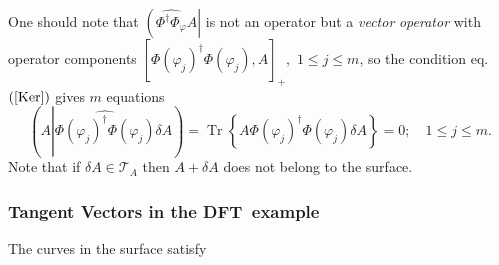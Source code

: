 \documentclass[aps,preprint]{revtex4}%
\begin{document}
One should note that $\left(  \widehat{\Phi^{\dagger}\Phi_{\varphi}%
}A\right\vert $ is not an operator but a \emph{vector} \emph{operator }with
operator components $\left[  \Phi\left(  \varphi_{j}\right)  ^{\dagger}%
\Phi\left(  \varphi_{j}\right)  ,A\right]  _{+},$ $1\leq j\leq m$, so the
condition eq. $\left(  \ref{Ker}\right)  $ gives $m$ equations%
\begin{equation}
\left(  A\left\vert \widehat{\Phi\left(  \varphi_{j}\right)  ^{\dagger}%
\Phi\left(  \varphi_{j}\right)  }\delta A\right.  \right)  =\operatorname{Tr}%
\left\{  A\Phi\left(  \varphi_{j}\right)  ^{\dagger}\Phi\left(  \varphi
_{j}\right)  \delta A\right\}  =0;\quad1\leq j\leq m.
\end{equation}
Note that if $\delta A\in\mathcal{T}_{A}$ then $A+\delta A$ does not belong to
the surface.

\subsubsection{Tangent Vectors in the DFT\ example}

The curves in the surface satisfy%
\end{document}
